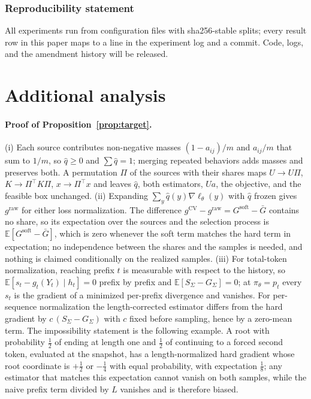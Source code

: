 \subsubsection*{Reproducibility statement}
All experiments run from configuration files with sha256-stable splits;
every result row in this paper maps to a line in the experiment log
and a commit. Code, logs, and the amendment history will be released.

\section{Additional analysis}\label{app:analysis}

\paragraph{Proof of Proposition~\ref{prop:target}.}
(i) Each source contributes non-negative masses $(1-a_{ij})/m$ and
$a_{ij}/m$ that sum to $1/m$, so $\hat q\ge0$ and $\sum\hat q=1$;
merging repeated behaviors adds masses and preserves both. A
permutation $\Pi$ of the sources with their shares maps $U\to U\Pi$,
$K\to\Pi^{\top}K\Pi$, $x\to\Pi^{\top}x$ and leaves $\hat q$, both
estimators, $Ua$, the objective, and the feasible box unchanged. (ii)
Expanding $\sum_y\hat q(y)\nabla\ell_\theta(y)$ with $\hat q$ frozen
gives $g^{\mathrm{raw}}$ for either loss normalization. The difference
$g^{\mathrm{CV}}-g^{\mathrm{raw}}=G^{\mathrm{soft}}-\bar G$ contains no
share, so its expectation over the sources and the selection process
is $\mathbb{E}[G^{\mathrm{soft}}-\bar G]$, which is zero whenever the
soft term matches the hard term in expectation; no independence
between the shares and the samples is needed, and nothing is claimed
conditionally on the realized samples. (iii) For total-token
normalization, reaching prefix $t$ is measurable with respect to the
history, so $\mathbb{E}[s_t-g_t(Y_t)\mid h_t]=0$ prefix by prefix and
$\mathbb{E}[S_{\Sigma}-G_{\Sigma}]=0$; at $\pi_\theta=p_t$ every
$s_t$ is the gradient of a minimized per-prefix divergence and
vanishes. For per-sequence normalization the length-corrected
estimator differs from the hard gradient by
$c\,(S_{\Sigma}-G_{\Sigma})$ with $c$ fixed before sampling, hence by
a zero-mean term. The impossibility statement is the following
example. A root with probability $\tfrac12$ of ending at length one
and $\tfrac12$ of continuing to a forced second token, evaluated at the
snapshot, has a length-normalized hard gradient whose root coordinate
is $+\tfrac12$ or $-\tfrac14$ with equal probability, with expectation
$\tfrac18$; any estimator that matches this expectation cannot vanish
on both samples, while the naive prefix term divided by $L$ vanishes
and is therefore biased.

